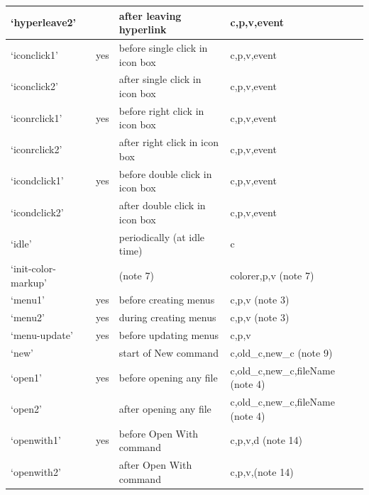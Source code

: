 \documentclass[a4paper,10pt,english]{sphinxmanual}
\begin{document}
\begin{longtable}{|l|l|l|l|}
`hyperleave2'
 &  & 
after  leaving  hyperlink
 & 
c,p,v,event
\\\hline

`iconclick1'
 & 
yes
 & 
before single click in icon box
 & 
c,p,v,event
\\\hline

`iconclick2'
 &  & 
after  single click in icon box
 & 
c,p,v,event
\\\hline

`iconrclick1'
 & 
yes
 & 
before right click in icon box
 & 
c,p,v,event
\\\hline

`iconrclick2'
 &  & 
after  right click in icon box
 & 
c,p,v,event
\\\hline

`icondclick1'
 & 
yes
 & 
before double click in icon box
 & 
c,p,v,event
\\\hline

`icondclick2'
 &  & 
after  double click in icon box
 & 
c,p,v,event
\\\hline

`idle'
 &  & 
periodically (at idle time)
 & 
c
\\\hline

`init-color-markup'
 &  & 
(note 7)
 & 
colorer,p,v (note 7)
\\\hline

`menu1'
 & 
yes
 & 
before creating menus
 & 
c,p,v (note 3)
\\\hline

`menu2'
 & 
yes
 & 
during creating menus
 & 
c,p,v (note 3)
\\\hline

`menu-update'
 & 
yes
 & 
before updating menus
 & 
c,p,v
\\\hline

`new'
 &  & 
start of New command
 & 
c,old\_c,new\_c (note 9)
\\\hline

`open1'
 & 
yes
 & 
before opening any file
 & 
c,old\_c,new\_c,fileName (note 4)
\\\hline

`open2'
 &  & 
after  opening any file
 & 
c,old\_c,new\_c,fileName (note 4)
\\\hline

`openwith1'
 & 
yes
 & 
before Open With command
 & 
c,p,v,d (note 14)
\\\hline

`openwith2'
 &  & 
after  Open With command
 & 
c,p,v,(note 14)
\\\hline


\end{longtable}
\end{document}
